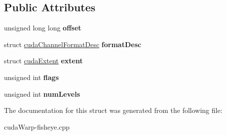 \subsection*{Public Attributes}
\begin{DoxyCompactItemize}
\item 
unsigned long long {\bfseries offset}\hypertarget{structcudaExternalMemoryMipmappedArrayDesc_a2f9441c3c6e3100f1517ccaf668ffd83}{}\label{structcudaExternalMemoryMipmappedArrayDesc_a2f9441c3c6e3100f1517ccaf668ffd83}

\item 
struct \hyperlink{structcudaChannelFormatDesc}{cuda\+Channel\+Format\+Desc} {\bfseries format\+Desc}\hypertarget{structcudaExternalMemoryMipmappedArrayDesc_a42333e3049cc4a40213b086be45927e1}{}\label{structcudaExternalMemoryMipmappedArrayDesc_a42333e3049cc4a40213b086be45927e1}

\item 
struct \hyperlink{structcudaExtent}{cuda\+Extent} {\bfseries extent}\hypertarget{structcudaExternalMemoryMipmappedArrayDesc_acba41d5152a8458ac72a24e65ee0f3ac}{}\label{structcudaExternalMemoryMipmappedArrayDesc_acba41d5152a8458ac72a24e65ee0f3ac}

\item 
unsigned int {\bfseries flags}\hypertarget{structcudaExternalMemoryMipmappedArrayDesc_ade6d5579b7f13034ea82e06012c8758f}{}\label{structcudaExternalMemoryMipmappedArrayDesc_ade6d5579b7f13034ea82e06012c8758f}

\item 
unsigned int {\bfseries num\+Levels}\hypertarget{structcudaExternalMemoryMipmappedArrayDesc_a4a939b3d6c1fca916dd78679049f36eb}{}\label{structcudaExternalMemoryMipmappedArrayDesc_a4a939b3d6c1fca916dd78679049f36eb}

\end{DoxyCompactItemize}


The documentation for this struct was generated from the following file\+:\begin{DoxyCompactItemize}
\item 
cuda\+Warp-\/fisheye.\+cpp\end{DoxyCompactItemize}
